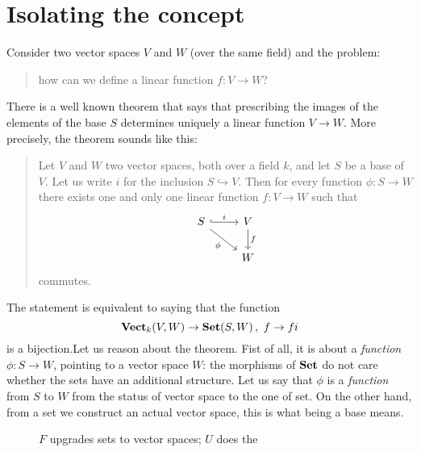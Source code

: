 
\section{Isolating the concept}

\begin{example}\label{example:DefineLinearFunctionsI}
  Consider two vector spaces \(V\) and \(W\) (over the same field) and
  the problem:
%
  \begin{quotation}
    how can we define a linear function \(f : V \to W\)?
  \end{quotation}
%
  There is a well known theorem that says that prescribing the images
  of the elements of the base \(S\) determines uniquely a linear
  function \(V \to W\). More precisely, the theorem sounds like this:
%
  \begin{quotation}
    Let \(V\) and \(W\) two vector spaces, both over a field \(k\),
    and let \(S\) be a base of \(V\). Let us write \(i\) for the
    inclusion \(S \hookrightarrow V\). Then for every function
    \(\phi : S \to W\) there exists one and only one linear function
    \(f : V \to W\) such that
    \begin{equation}\begin{tikzcd}
        S \ar["i", r, hook] \ar["\phi", dr, swap] & V \ar["f", d] \\
        & W
      \end{tikzcd}\label{diagram:FunctionsExtendsToALinearMapI}\end{equation}
    commutes.
  \end{quotation}
%
  The statement is equivalent to saying that the function
  \begin{equation}
    \mathbf{Vect}_k(V, W) \to \mathbf{Set}(S, W) \,,\ f \to fi \label{function:AdjBijSetVectI}
  \end{equation}
  is a bijection.\newline Let us reason about the theorem. Fist of all, it is
  about a {\em function} \(\phi : S \to W\), pointing to a vector space
  \(W\): the morphisms of \(\mathbf{Set}\) do not care whether the sets have
  an additional structure. Let us say that \(\phi\) is a {\em function}
  from \(S\) to \(W\)  from the status of vector space
  to the one of set. On the other hand, from a set we construct an
  actual vector space, this is what being a base means.
%
  \begin{figure}
    \centering 
    \caption{\(F\) upgrades sets to vector spaces; \(U\) does the
}
\end{figure}
\end{example}

